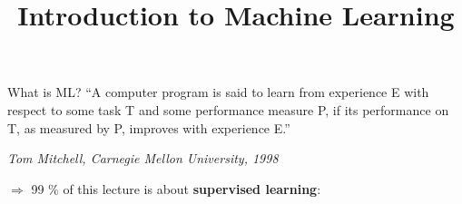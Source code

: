 \documentclass[11pt,compress,t,notes=noshow, xcolor=table]{beamer}
\title{Introduction to Machine Learning}
\begin{document}

\sloppy


\begin{vbframe}{What is ML?}
    ``A computer program is said to learn from experience E with respect to
  some task T and some performance measure P, if its performance on T, as
  measured by P, improves with experience E.''\\
  \begin{footnotesize}
  \emph{Tom Mitchell, Carnegie Mellon University, 1998}\\
  \end{footnotesize}

\vspace{1ex}

$\Rightarrow$ 99 $\%$ of this lecture is about \textbf{supervised learning}:


\end{vbframe}
\end{document}
